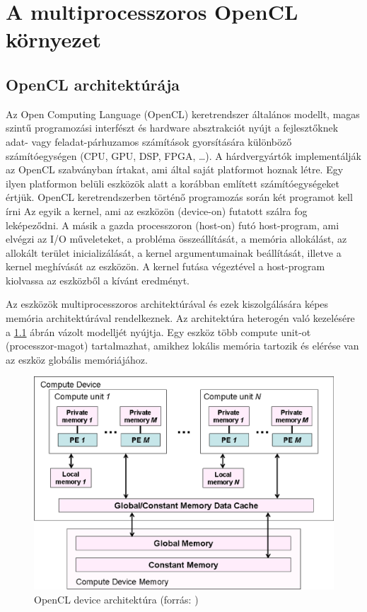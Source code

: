\chapter{A multiprocesszoros OpenCL környezet} \label{sec:opencl}

\section{OpenCL architektúrája}
	Az Open Computing Language (OpenCL) keretrendszer \cite{opencl}
	általános modellt, magas szintű programozási interfészt és hardware
	absztrakciót nyújt a fejlesztőknek adat- vagy feladat-párhuzamos számítások gyorsítására különböző
	számítóegységen (CPU, GPU, DSP, FPGA, \ldots).
	A hárdvergyártók implementálják az OpenCL szabványban írtakat, ami által saját platformot
	hoznak létre. Egy ilyen platformon belüli eszközök alatt a korábban említett számítóegységeket értjük.
	OpenCL keretrendszerben történő programozás során két programot kell írni
	Az egyik a kernel, ami az eszközön (device-on) futatott szálra fog leképeződni.
	A másik a gazda processzoron (host-on) futó host-program, ami elvégzi az I/O műveleteket,
	a probléma összeállítását, a memória allokálást, az allokált terület inicializálását, a kernel argumentumainak beállítását,
	illetve a kernel meghívását az eszközön.
	A kernel futása végeztével a host-program kiolvassa az eszközből a kívánt eredményt.
	
	Az eszközök multiprocesszoros architektúrával és ezek kiszolgálására képes memória architektúrával rendelkeznek. 
	Az architektúra heterogén való kezelésére a \ref{fig:device} ábrán vázolt modelljét nyújtja.
	Egy eszköz több compute unit-ot (processzor-magot) tartalmazhat, amikhez lokális memória tartozik és elérése van az eszköz globális memóriájához.
	\newpage
	\begin{figure}[!t]
		\centering
		\includegraphics[width=0.6\columnwidth]{figures/eps/device.eps}
		\caption{OpenCL device architektúra (forrás: \cite{opencl})} 
		\label{fig:device} 
	\end{figure}
	
